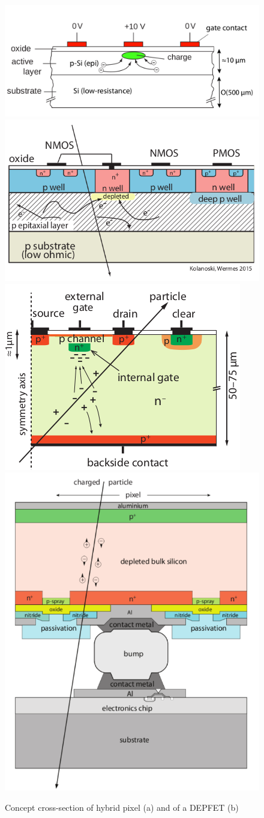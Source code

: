 \begin{figure}
   \centering
   \includegraphics[width=.54\linewidth]{figures/Pixel_detectors/CCD.png}
   \includegraphics[width=.44\linewidth]{figures/Pixel_detectors/MAPS_scheme.png}\\
   \includegraphics[width=.54\linewidth]{figures/Pixel_detectors/DEPFET_scheme.png}
   \includegraphics[width=.44\linewidth]{figures/Pixel_detectors/hybrid_scheme.png}
   \caption{Concept cross-section of hybrid pixel (a) and of a DEPFET (b)}
   \label{fig:hybrid_DEPFET_scheme}
\end{figure}

